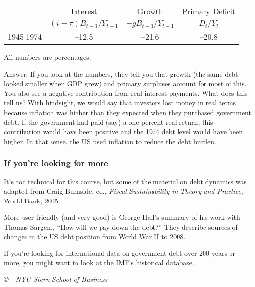 \documentclass[letterpaper,12pt]{article}
\begin{document}
\begin{enumerate}
\begin{center}
\begin{tabular}{lccc}
\toprule
       & Interest &  Growth & Primary Deficit \\
       &  $(i-\pi)B_{t-1}/Y_{t-1}$  &  $-g B_{t-1}/Y_{t-1}$
                & $D_t/Y_t$ \\
\midrule
1945-1974 \hspace*{0.4in} & --12.5  & --21.6  &  --20.8 \\
\bottomrule
\end{tabular}
\end{center}
All numbers are percentages.

Answer.  If you look at the numbers, they tell you that
growth (the same debt looked smaller when GDP grew)
and primary surpluses account for most of this.
You also see a negative contribution from real interest
payments.
What does this tell us?
With hindsight,
we would say that investors lost money in real terms
because inflation was higher than they expected when they
purchased government debt.
If the government had paid (say) a one percent real return,
this contribution would have been positive
and the 1974 debt level would have been higher.
In that sense, the US used inflation to reduce the debt burden.
\end{enumerate}


\subsubsection*{If you're looking for more}

It's too technical for this course,
but some of the material on debt dynamics was adapted from
Craig Burnside, ed., {\it Fiscal Sustainability in Theory and Practice\/},
World Bank, 2005.

More user-friendly (and very good)
is George Hall's summary of his work with Thomas Sargent,
``\href{http://www.brandeis.edu/global/rosenberg/briefs/hall_brief.html}
{How will we pay down the debt?}''
They describe sources of changes in the US debt position
from World War II to 2008.

If you're looking for international data on government debt over 200 years or more,
you might want to look at the IMF's
\href{http://www.imf.org/external/pubs/cat/longres.cfm?sk=24332.0}{historical database}.


\vfill \centerline{\it \copyright \ \number\year \
NYU Stern School of Business}
\end{document}
